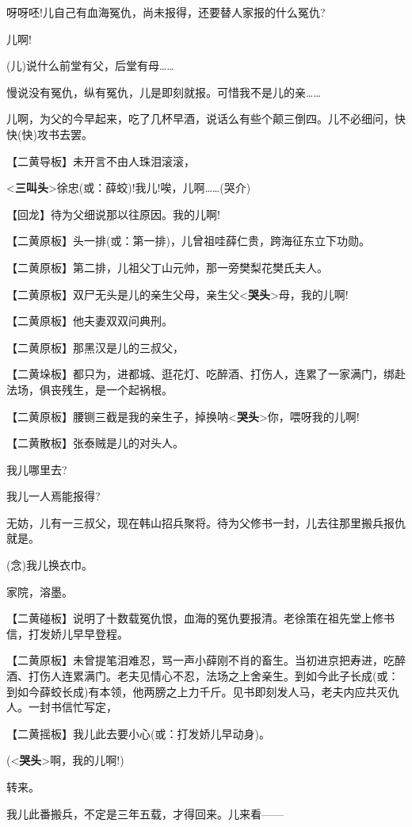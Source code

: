 呀呀呸!儿自己有血海冤仇，尚未报得，还要替人家报的什么冤仇?

儿啊!

(儿)说什么前堂有父，后堂有母\ldots{}\ldots{}

慢说没有冤仇，纵有冤仇，儿是即刻就报。可惜我不是儿的亲\ldots{}\ldots{}

儿啊，为父的今早起来，吃了几杯早酒，说话么有些个颠三倒四。儿不必细问，快快(快)攻书去罢。

【二黄导板】未开言不由人珠泪滚滚，

\textless{}\textbf{三叫头}\textgreater{}徐忠(或：薛蛟)!我儿!唉，儿啊\ldots{}\ldots{}(哭介)

【回龙】待为父细说那以往原因。我的儿啊!

【二黄原板】头一排(或：第一排)，儿曾祖哇薛仁贵，跨海征东立下功勋。

【二黄原板】第二排，儿祖父丁山元帅，那一旁樊梨花樊氏夫人。

【二黄原板】双尸无头是儿的亲生父母，亲生父\textless{}\textbf{哭头}\textgreater{}母，我的儿啊!

【二黄原板】他夫妻双双问典刑。

【二黄原板】那黑汉是儿的三叔父，

【二黄垛板】都只为，进都城、逛花灯、吃醉酒、打伤人，连累了一家满门，绑赴法场，俱丧残生，是一个起祸根。

【二黄原板】腰铡三截是我的亲生子，掉换呐\textless{}\textbf{哭头}\textgreater{}你，喂呀我的儿啊!

【二黄散板】张泰贼是儿的对头人。

我儿哪里去?

我儿一人焉能报得?

无妨，儿有一三叔父，现在韩山招兵聚将。待为父修书一封，儿去往那里搬兵报仇就是。

(念)我儿换衣巾。

家院，溶墨。

【二黄碰板】说明了十数载冤仇恨，血海的冤仇要报清。老徐策在祖先堂上修书信，打发娇儿早早登程。

【二黄原板】未曾提笔泪难忍，骂一声小薛刚不肖的畜生。当初进京把寿进，吃醉酒、打伤人连累满门。老夫见情心不忍，法场之上舍亲生。到如今此子长成(或：到如今薛蛟长成)有本领，他两膀之上力千斤。见书即刻发人马，老夫内应共灭仇人。一封书信忙写定，

【二黄摇板】我儿此去要小心(或：打发娇儿早动身)。

(\textless{}\textbf{哭头}\textgreater{}啊，我的儿啊!)

转来。

我儿此番搬兵，不定是三年五载，才得回来。儿来看------


